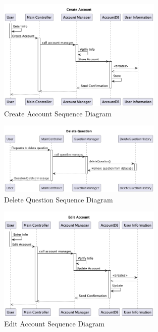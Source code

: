 \documentclass[]{article}
\numberwithin{figure}{section}
\begin{document}
\begin{figure}[ht]
    \centering
    \includegraphics[width=0.7\textwidth]{diagrams/sequence/create_account.png} %
    \caption{Create Account Sequence Diagram}
\end{figure}

\begin{figure}[ht]
    \centering
    \includegraphics[width=0.7\textwidth]{diagrams/sequence/deleteqsequence.png} %
    \caption{Delete Question Sequence Diagram}
\end{figure}

\begin{figure}[ht]
    \centering
    \includegraphics[width=0.7\textwidth]{diagrams/sequence/edit_account.png} %
    \caption{Edit Account Sequence Diagram}
\end{figure}
\end{document}

